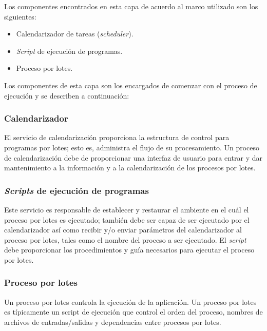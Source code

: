 Los componentes encontrados en esta capa de acuerdo al marco utilizado son los
siguientes:

\begin{itemize}
\item Calendarizador de tareas (\emph{scheduler}).
\item \emph{Script} de ejecución de programas.
\item Proceso por lotes.
\end{itemize}

Los componentes de esta capa son los encargados de comenzar con el proceso de
ejecución y se describen a continuación:

\subsubsection{Calendarizador}

El servicio de calendarización proporciona la estructura de control para
programas por lotes; esto es, administra el flujo de su procesamiento. Un
proceso de calendarización debe de proporcionar una interfaz de usuario para
entrar y dar mantenimiento a la información y a la calendarización de los
procesos por lotes.

\subsubsection{\emph{Scripts} de ejecución de programas}

Este servicio es responsable de establecer y restaurar el ambiente en el cuál el
proceso por lotes es ejecutado; también debe ser capaz de ser ejecutado por el
calendarizador así como recibir y/o enviar parámetros del calendarizador al
proceso por lotes, tales como el nombre del proceso a ser ejecutado. El
\emph{script} debe proporcionar los procedimientos y guía necesarios para
ejecutar el proceso por lotes.

\subsubsection{Proceso por lotes}
Un proceso por lotes controla la ejecución de la aplicación. Un proceso por lotes es típicamente un script de ejecución que control el orden del proceso, nombres de archivos de entradas/salidas y dependencias entre procesos por lotes.

